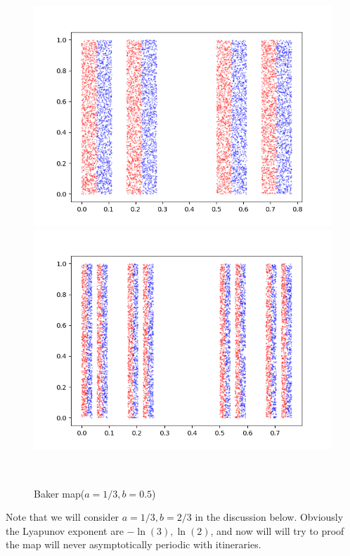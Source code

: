 \documentclass[12pt]{article}
\theoremstyle{plain}
\begin{document}
\begin{figure}[H]
\begin{minipage}[c][0.24\width]{
   0.24\textwidth}
   \includegraphics[width=1\textwidth]{figure/section5/baker-2-0*33-0*5.png}
\end{minipage}
\begin{minipage}[c][0.24\width]{
   0.24\textwidth}
   \centering
   \includegraphics[width=1\textwidth]{figure/section5/baker-3-0*33-0*5.png}
\end{minipage}
\\[2ex]\caption{Baker map($a = 1/3, b = 0.5$)}
\end{figure}

Note that we will consider $a = 1/3, b = 2/3$ in the discussion below. Obviously the Lyapunov exponent are $-\ln(3), \ln(2)$, and now will will try to proof the map will never asymptotically periodic with itineraries.
\end{document}
